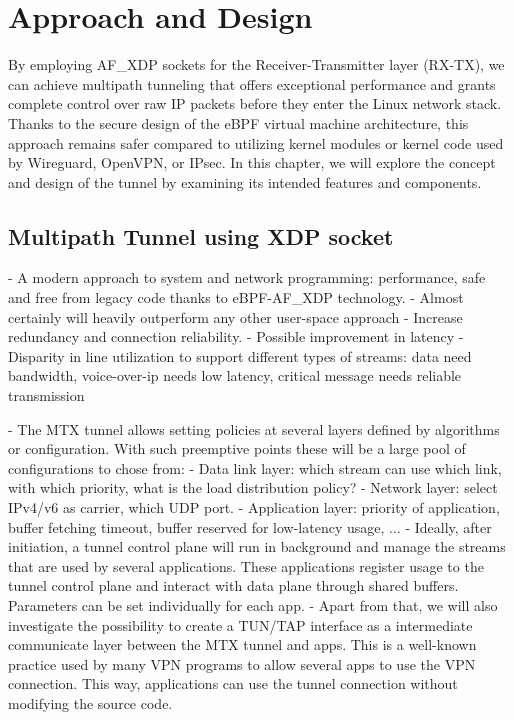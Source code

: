 \chapter{Approach and Design}\label{sec:approach_design}\minitoc\vspace{.5cm}

By employing AF\_XDP sockets for the Receiver-Transmitter layer (RX-TX), we can achieve multipath tunneling that offers exceptional performance and grants complete control over raw IP packets before they enter the Linux network stack. 
Thanks to the secure design of the eBPF virtual machine architecture, this approach remains safer compared to utilizing kernel modules or kernel code used by Wireguard, OpenVPN, or IPsec.
In this chapter, we will explore the concept and design of the tunnel by examining its intended features and components.

\section{Multipath Tunnel using XDP socket}




- A modern approach to system and network programming: performance, safe and free from legacy code thanks to eBPF-AF\_XDP technology.
- Almost certainly will heavily outperform any other user-space approach
- Increase redundancy and connection reliability.
- Possible improvement in latency
- Disparity in line utilization to support different types of streams: data need bandwidth, voice-over-ip needs low latency, critical message needs reliable transmission

- The MTX tunnel allows setting policies at several layers defined by algorithms or configuration. With such preemptive points these will be a large pool of configurations to chose from:
	- Data link layer: which stream can use which link, with which priority, what is the load distribution policy?
	- Network layer: select IPv4/v6 as carrier, which UDP port.
	- Application layer: priority of application, buffer fetching timeout, buffer reserved for low-latency usage, ...
- Ideally, after initiation, a tunnel control plane will run in background and manage the streams that are used by several applications. These applications register usage to the tunnel control plane and interact with data plane through shared buffers. Parameters can be set individually for each app.
- Apart from that, we will also investigate the possibility to create a TUN/TAP interface as a intermediate communicate layer between the MTX tunnel and apps. This is a well-known practice used by many VPN programs to allow several apps to use the VPN connection. This way, applications can use the tunnel connection without modifying the source code.

